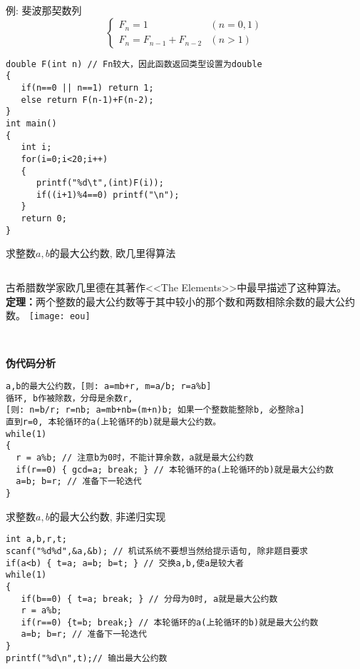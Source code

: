 \begin{frame}{例: 斐波那契数列}
\[ \begin{cases}
F_n=1 &(n=0,1)\\
F_n=F_{n-1}+F_{n-2} &(n>1)
\end{cases} 
\]
\pause
\begin{lstlisting}
double F(int n) // Fn较大，因此函数返回类型设置为double
{
   if(n==0 || n==1) return 1;
   else return F(n-1)+F(n-2);
}
int main()                   
{  
   int i;
   for(i=0;i<20;i++)
   {
      printf("%d\t",(int)F(i));
      if((i+1)%4==0) printf("\n");	
   } 
   return 0;           
}                            
\end{lstlisting}
\end{frame}

\begin{frame}{求整数$a,b$的最大公约数, 欧几里得算法}
\begin{columns}
	古希腊数学家欧几里德在其著作<<The Elements>>中最早描述了这种算法。\\
	\textbf{定理：}两个整数的最大公约数等于其中较小的那个数和两数相除余数的最大公约数。
	\texttt{[image: eou]}
\end{columns}
~\\
\textbf{伪代码分析}
\begin{lstlisting}
a,b的最大公约数，[则: a=mb+r, m=a/b; r=a%b]
循环, b作被除数，分母是余数r, 
[则: n=b/r; r=nb; a=mb+nb=(m+n)b; 如果一个整数能整除b, 必整除a]
直到r=0, 本轮循环的a(上轮循环的b)就是最大公约数。 
while(1)
{
  r = a%b; // 注意b为0时，不能计算余数，a就是最大公约数
  if(r==0) { gcd=a; break; } // 本轮循环的a(上轮循环的b)就是最大公约数
  a=b; b=r; // 准备下一轮迭代    
}
\end{lstlisting}
\end{frame}

\begin{frame}{求整数$a,b$的最大公约数, 非递归实现}
\begin{lstlisting}
int a,b,r,t;
scanf("%d%d",&a,&b); // 机试系统不要想当然给提示语句, 除非题目要求
if(a<b) { t=a; a=b; b=t; } // 交换a,b,使a是较大者
while(1)
{
   if(b==0) { t=a; break; } // 分母为0时, a就是最大公约数
   r = a%b; 
   if(r==0) {t=b; break;} // 本轮循环的a(上轮循环的b)就是最大公约数
   a=b; b=r; // 准备下一轮迭代   
}
printf("%d\n",t);// 输出最大公约数
\end{lstlisting}
\end{frame}

